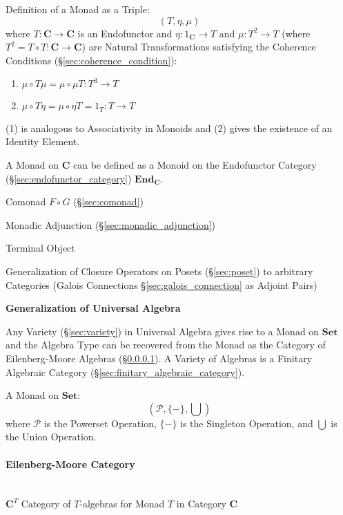 Definition of a Monad as a Triple:
\[
  (T, \eta, \mu)
\]
where $T : \mathbf{C} \rightarrow \mathbf{C}$ is an Endofunctor and
$\eta : 1_\mathbf{C} \rightarrow T$ and $\mu : T^2 \rightarrow T$
(where $T^2 = T \circ T : \mathbf{C} \rightarrow \mathbf{C}$) are
Natural Transformations satisfying the Coherence Conditions
(\S\ref{sec:coherence_condition}):
\begin{enumerate}
  \item $\mu \circ T\mu = \mu \circ \mu T : T^3 \rightarrow T$
  \item $\mu \circ T\eta = \mu \circ \eta T = 1_T : T \rightarrow T$
\end{enumerate}
(1) is analogous to Associativity in Monoids and (2) gives the
existence of an Identity Element.

A Monad on $\mathbf{C}$ can be defined as a Monoid on the Endofunctor
Category (\S\ref{sec:endofunctor_category}) $\mathbf{End_C}$.



Comonad $F \circ G$ (\S\ref{sec:comonad})

Monadic Adjunction (\S\ref{sec:monadic_adjunction})

Terminal Object %

Generalization of Closure Operators on Posets (\S\ref{sec:poset}) to
arbitrary Categories (Galois Connections \S\ref{sec:galois_connection}
as Adjoint Pairs)



\textbf{Generalization of Universal Algebra}

Any Variety (\S\ref{sec:variety}) in Universal Algebra gives rise to a
Monad on $\mathbf{Set}$ and the Algebra Type can be recovered from the
Monad as the Category of Eilenberg-Moore Algebras
(\S\ref{sec:eilenberg_moore}). A Variety of Algebras is a Finitary
Algebraic Category (\S\ref{sec:finitary_algebraic_category}).

A Monad on $\mathbf{Set}$:
\[
  (\mathcal{P}, \{-\}, \bigcup)
\]
where $\mathcal{P}$ is the Powerset Operation, $\{-\}$ is the
Singleton Operation, and $\bigcup$ is the Union Operation.



\paragraph{Eilenberg-Moore Category}\label{sec:eilenberg_moore}
\hfill \\

$\mathbf{C}^T$ Category of $T$-algebras for Monad $T$ in Category
$\mathbf{C}$




